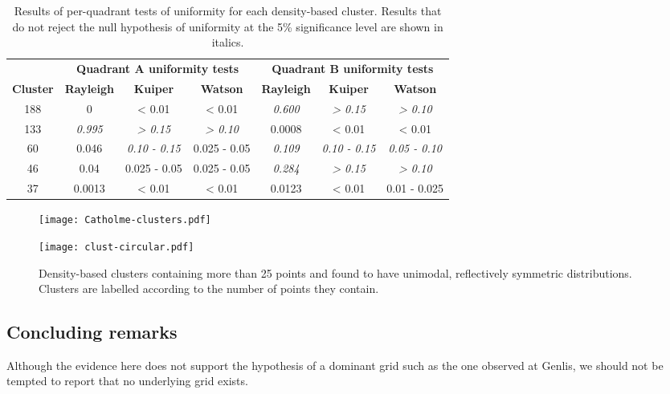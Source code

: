 \documentclass[../../ArchStats.tex]{subfiles}
\begin{document}
\begin{table}[!ht]
\footnotesize
\caption{Results of per-quadrant tests of uniformity for each density-based cluster. Results that do not reject the null hypothesis of uniformity at the 5\% significance level are shown in italics.}
\label{tab:Cat-quads}
\begin{tabular}{c|ccc|ccc}
                 & \multicolumn{3}{c|}{\textbf{Quadrant A uniformity tests}} & \multicolumn{3}{c}{\textbf{Quadrant B uniformity tests}}\\
\textbf{Cluster} & \textbf{Rayleigh} & \textbf{Kuiper} & \textbf{Watson} & \textbf{Rayleigh} & \textbf{Kuiper} & \textbf{Watson} \\
\hline
188 & 0     & < 0.01 & < 0.01 & \textit{0.600} & \textit{> 0.15} & \textit{> 0.10} \\
133 & \textit{0.995} & \textit{> 0.15} & \textit{> 0.10} & 0.0008& < 0.01 & < 0.01 \\
60  & 0.046 &\textit{ 0.10 - 0.15} & 0.025 - 0.05 &\textit{ 0.109 }&\textit{ 0.10 - 0.15}&\textit{ 0.05 - 0.10}\\
46  & 0.04 &  0.025 - 0.05  &  0.025 - 0.05  &\textit{ 0.284} &\textit{> 0.15} &\textit{> 0.10}\\
37  &0.0013 & < 0.01   &< 0.01  &  0.0123  &   < 0.01   & 0.01 - 0.025  \\
\end{tabular}
\end{table}


\begin{figure}[!ht]
\caption{Density-based clusters containing more than 25 points and found to have unimodal, reflectively symmetric distributions. Clusters are labelled according to the number of points they contain.} 
\begin{minipage}[t]{0.47\textwidth}
	\centering
	\label{fig:Cat-clusters}
 	\texttt{[image: Catholme-clusters.pdf]}
 \end{minipage}
 \hfill
	\begin{minipage}[t]{0.47\textwidth}
  		\centering
		\label{fig:clust-circ}
		\texttt{[image: clust-circular.pdf]}
    \end{minipage}
 \end{figure}
 
\subsection{Concluding remarks}
 
Although the evidence here does not support the hypothesis of a dominant grid such as the one observed at Genlis, we should not be tempted to report that no underlying grid exists. 
\end{document}
